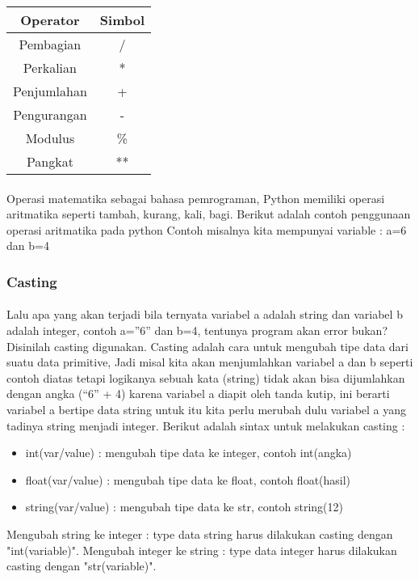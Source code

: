 \documentclass{article}
\begin{document}
\begin{tabular}{|c|c|}
\hline
Operator & Simbol\\
\hline
Pembagian & /\\
\hline
Perkalian & *\\
\hline
Penjumlahan & +\\
\hline
Pengurangan & -\\
\hline
Modulus & \% \\
\hline
Pangkat & **\\
\hline
\end{tabular}

\paragraph{}
Operasi matematika sebagai bahasa pemrograman, Python memiliki operasi aritmatika seperti tambah, kurang, kali, bagi. Berikut adalah contoh penggunaan operasi aritmatika pada python
Contoh misalnya kita mempunyai variable : a=6 dan b=4\\

\subsubsection{Casting}
\paragraph{}
Lalu apa yang akan terjadi bila ternyata variabel a adalah string dan variabel b adalah integer, contoh a=”6” dan b=4, tentunya program akan error bukan? Disinilah casting digunakan. Casting adalah cara untuk mengubah tipe data dari suatu data primitive, Jadi misal kita akan menjumlahkan variabel a dan b seperti contoh diatas tetapi logikanya sebuah kata (string) tidak akan bisa dijumlahkan dengan angka (“6” + 4) karena variabel a diapit oleh tanda kutip, ini berarti variabel a bertipe data string untuk itu kita perlu merubah dulu variabel a yang tadinya string menjadi integer. Berikut adalah sintax untuk melakukan casting :
\begin{itemize}
	\item int(var/value) : mengubah tipe data ke integer, contoh int(angka)
	\item float(var/value) : mengubah tipe data ke float, contoh float(hasil)
	\item string(var/value) : mengubah tipe data ke str, contoh string(12)
\end{itemize}
Mengubah string ke integer : type data string harus dilakukan casting dengan "int(variable)".
Mengubah integer ke string : type data integer harus dilakukan casting dengan "str(variable)".\\
\end{document}
